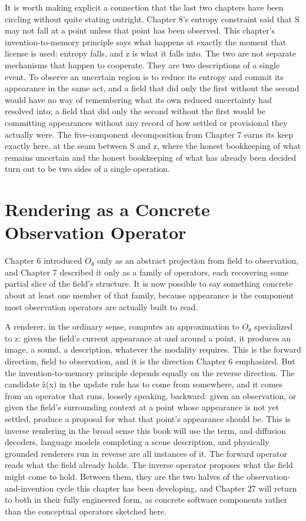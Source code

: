 It is worth making explicit a connection that the last two chapters have been circling without quite stating outright. Chapter 8's entropy constraint said that S may not fall at a point unless that point has been observed. This chapter's invention-to-memory principle says what happens at exactly the moment that license is used: entropy falls, and z is what it falls into. The two are not separate mechanisms that happen to cooperate. They are two descriptions of a single event. To observe an uncertain region is to reduce its entropy and commit its appearance in the same act, and a field that did only the first without the second would have no way of remembering what its own reduced uncertainty had resolved into; a field that did only the second without the first would be committing appearances without any record of how settled or provisional they actually were. The five-component decomposition from Chapter 7 earns its keep exactly here, at the seam between S and z, where the honest bookkeeping of what remains uncertain and the honest bookkeeping of what has already been decided turn out to be two sides of a single operation.

\section{Rendering as a Concrete Observation Operator}

Chapter 6 introduced \(O_\theta\) only as an abstract projection from field to observation, and Chapter 7 described it only as a family of operators, each recovering some partial slice of the field's structure. It is now possible to say something concrete about at least one member of that family, because appearance is the component most observation operators are actually built to read.

A renderer, in the ordinary sense, computes an approximation to \(O_\theta\) specialized to z: given the field's current appearance at and around a point, it produces an image, a sound, a description, whatever the modality requires. This is the forward direction, field to observation, and it is the direction Chapter 6 emphasized. But the invention-to-memory principle depends equally on the reverse direction. The candidate ẑ(x) in the update rule has to come from somewhere, and it comes from an operator that runs, loosely speaking, backward: given an observation, or given the field's surrounding context at a point whose appearance is not yet settled, produce a proposal for what that point's appearance should be. This is inverse rendering in the broad sense this book will use the term, and diffusion decoders, language models completing a scene description, and physically grounded renderers run in reverse are all instances of it. The forward operator reads what the field already holds. The inverse operator proposes what the field might come to hold. Between them, they are the two halves of the observation-and-invention cycle this chapter has been developing, and Chapter 27 will return to both in their fully engineered form, as concrete software components rather than the conceptual operators sketched here.

